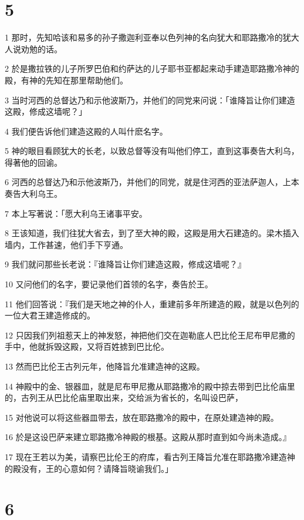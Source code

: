 \chapter{5}

\par 1 那时，先知哈该和易多的孙子撒迦利亚奉以色列神的名向犹大和耶路撒冷的犹大人说劝勉的话。
\par 2 於是撒拉铁的儿子所罗巴伯和约萨达的儿子耶书亚都起来动手建造耶路撒冷神的殿，有神的先知在那里帮助他们。
\par 3 当时河西的总督达乃和示他波斯乃，并他们的同党来问说：「谁降旨让你们建造这殿，修成这墙呢？」
\par 4 我们便告诉他们建造这殿的人叫什麽名字。
\par 5 神的眼目看顾犹大的长老，以致总督等没有叫他们停工，直到这事奏告大利乌，得著他的回谕。
\par 6 河西的总督达乃和示他波斯乃，并他们的同党，就是住河西的亚法萨迦人，上本奏告大利乌王。
\par 7 本上写著说：「愿大利乌王诸事平安。
\par 8 王该知道，我们往犹大省去，到了至大神的殿，这殿是用大石建造的。梁木插入墙内，工作甚速，他们手下亨通。
\par 9 我们就问那些长老说：『谁降旨让你们建造这殿，修成这墙呢？』
\par 10 又问他们的名字，要记录他们首领的名字，奏告於王。
\par 11 他们回答说：『我们是天地之神的仆人，重建前多年所建造的殿，就是以色列的一位大君王建造修成的。
\par 12 只因我们列祖惹天上的神发怒，神把他们交在迦勒底人巴比伦王尼布甲尼撒的手中，他就拆毁这殿，又将百姓掳到巴比伦。
\par 13 然而巴比伦王古列元年，他降旨允准建造神的这殿。
\par 14 神殿中的金、银器皿，就是尼布甲尼撒从耶路撒冷的殿中掠去带到巴比伦庙里的，古列王从巴比伦庙里取出来，交给派为省长的，名叫设巴萨，
\par 15 对他说可以将这些器皿带去，放在耶路撒冷的殿中，在原处建造神的殿。
\par 16 於是这设巴萨来建立耶路撒冷神殿的根基。这殿从那时直到如今尚未造成。』
\par 17 现在王若以为美，请察巴比伦王的府库，看古列王降旨允准在耶路撒冷建造神的殿没有，王的心意如何？请降旨晓谕我们。」

\chapter{6}

